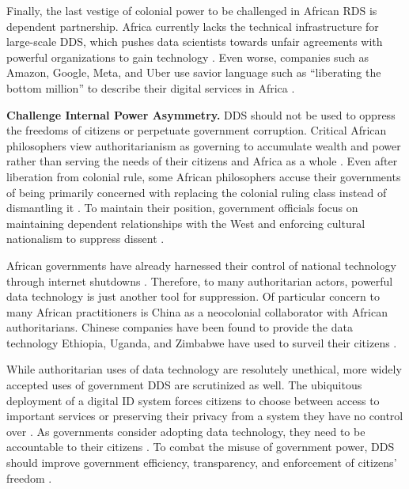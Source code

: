 Finally, the last vestige of colonial power 
to be challenged in African RDS is dependent partnership. Africa currently lacks the technical infrastructure for large-scale DDS, which pushes data scientists towards unfair agreements with powerful organizations to gain technology \cite{shilongo2023creativity, hountondji2004producing, osaghae2004rescuing}. Even worse, companies such as Amazon, Google, Meta, and Uber use savior language such as ``liberating the bottom million'' to describe their digital services in Africa \cite{abebe2021narratives}. 

\textbf{Challenge Internal Power Asymmetry.} 
\label{sec:chall_in}
DDS should not be used to oppress the freedoms of citizens or perpetuate government corruption. 
Critical African philosophers view authoritarianism as governing to accumulate wealth and power rather than serving the needs of their citizens and Africa as a whole \cite{nyerere1962ujamaa}.  
Even after liberation from colonial rule, some African philosophers accuse their governments of being primarily concerned with replacing the colonial ruling class instead of dismantling it \cite{coetzee2004laterMarx, kohnert2022machine}. To maintain their position, government officials focus on maintaining dependent relationships with the West and enforcing cultural nationalism to suppress dissent \cite{gwagwa2019recommendations}. 

African governments have already harnessed their control of national technology through internet shutdowns \cite{okolo2023responsible}. Therefore, to many authoritarian actors, powerful data technology is just another tool for suppression. Of particular concern to many African practitioners is China as a neocolonial collaborator with African authoritarians. Chinese companies have been found to provide the data technology Ethiopia, Uganda, and Zimbabwe have used to surveil their citizens \cite{okolo2023responsible}.

While authoritarian uses of data technology are resolutely unethical, more widely accepted uses of government DDS are scrutinized as well. 
The ubiquitous deployment of a digital ID system forces citizens to choose between access to important services or preserving their privacy from a system they have no control over \cite{gwagwa2019recommendations}. 
As governments consider adopting data technology, they need to be accountable to their citizens \cite{ade-ibijola2023artificial,osaghae2004rescuing}. 
To combat the misuse of government power, DDS should improve government efficiency, transparency, and enforcement of citizens' freedom \cite{gwagwa2019recommendations, mabe2007security, eke2023towards}. 

